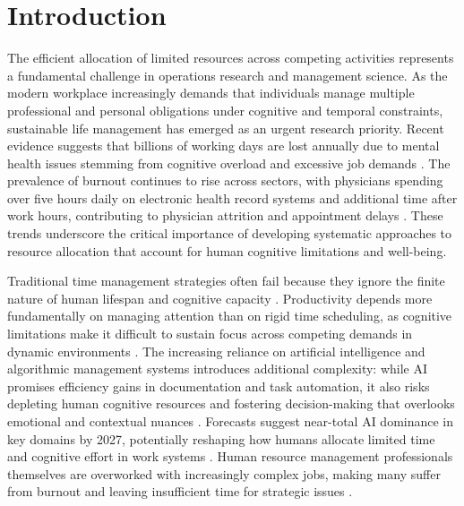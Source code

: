 \section{Introduction}

The efficient allocation of limited resources across competing activities represents a fundamental challenge in operations research and management science. As the modern workplace increasingly demands that individuals manage multiple professional and personal obligations under cognitive and temporal constraints, sustainable life management has emerged as an urgent research priority. Recent evidence suggests that billions of working days are lost annually due to mental health issues stemming from cognitive overload and excessive job demands \citep{Robinson2024}. The prevalence of burnout continues to rise across sectors, with physicians spending over five hours daily on electronic health record systems and additional time after work hours, contributing to physician attrition and appointment delays \citep{celik_frontiers_2024}. These trends underscore the critical importance of developing systematic approaches to resource allocation that account for human cognitive limitations and well-being.

Traditional time management strategies often fail because they ignore the finite nature of human lifespan and cognitive capacity \citep{Hart2024}. Productivity depends more fundamentally on managing attention than on rigid time scheduling, as cognitive limitations make it difficult to sustain focus across competing demands in dynamic environments \citep{Grant2019}. The increasing reliance on artificial intelligence and algorithmic management systems introduces additional complexity: while AI promises efficiency gains in documentation and task automation, it also risks depleting human cognitive resources and fostering decision-making that overlooks emotional and contextual nuances \citep{Reinhart2025}. Forecasts suggest near-total AI dominance in key domains by 2027, potentially reshaping how humans allocate limited time and cognitive effort in work systems \citep{Douthat2025}. Human resource management professionals themselves are overworked with increasingly complex jobs, making many suffer from burnout and leaving insufficient time for strategic issues \citep{aguinis_how_2024}.

